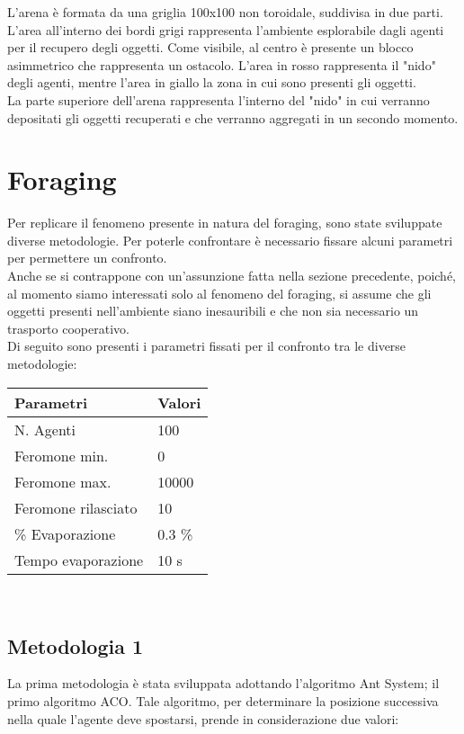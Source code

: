 \documentclass[12pt,a4paper,openright,twoside]{report}
\begin{document}
L'arena è formata da una griglia 100x100 non toroidale, suddivisa in due parti.\\
L'area all'interno dei bordi grigi rappresenta l'ambiente esplorabile dagli agenti per il recupero degli oggetti. Come visibile, al centro è presente un blocco asimmetrico che rappresenta un ostacolo. L'area in rosso rappresenta il "nido" degli agenti, mentre l'area in giallo la zona in cui sono presenti gli oggetti.\\
La parte superiore dell'arena rappresenta l'interno del "nido" in cui verranno depositati gli oggetti recuperati e che verranno aggregati in un secondo momento. 

\section{Foraging}

Per replicare il fenomeno presente in natura del foraging, sono state sviluppate diverse metodologie. Per poterle confrontare è necessario fissare alcuni parametri per permettere un confronto.\\
Anche se si contrappone con un'assunzione fatta nella sezione precedente, poiché, al momento siamo interessati solo al fenomeno del foraging, si assume che gli oggetti presenti nell'ambiente siano inesauribili e che non sia necessario un trasporto cooperativo.\\
Di seguito sono presenti i parametri fissati per il confronto tra le diverse metodologie:\\

\begin{tabular}{p{5cm}|p{5cm}} 
	 \textbf{ Parametri} & \textbf{ Valori} \\ \hline
	 N. Agenti & 100 \\
	 Feromone min. & 0 \\
	 Feromone max. & 10000 \\
	 Feromone rilasciato & 10\\
	 \% Evaporazione & 0.3 \% \\
	 Tempo evaporazione & 10 s
\end{tabular}
\\
\subsection{Metodologia 1}

La prima metodologia è stata sviluppata adottando l'algoritmo Ant System; il primo algoritmo ACO.
Tale algoritmo, per determinare la posizione successiva nella quale l'agente deve spostarsi, prende in considerazione due valori:
\end{document}
